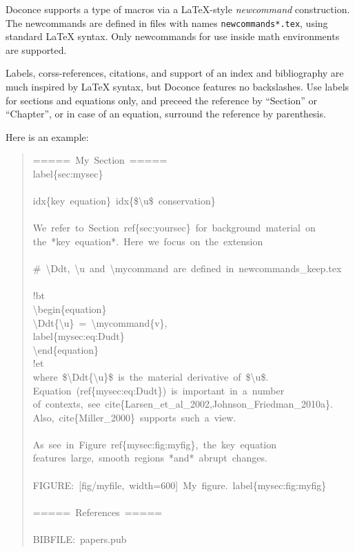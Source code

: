 \documentclass[a4paper]{article}
\begin{document}
Doconce supports a type of macros via a LaTeX-style \emph{newcommand}
construction.  The newcommands are defined in files with names
\texttt{newcommands*.tex}, using standard LaTeX syntax. Only newcommands
for use inside math environments are supported.

Labels, corss-references, citations, and support of an index and
bibliography are much inspired by LaTeX syntax, but Doconce features
no backslashes. Use labels for sections and equations only, and
preceed the reference by ``Section'' or ``Chapter'', or in case of
an equation, surround the reference by parenthesis.

Here is an example:
%
\begin{quote}{\ttfamily \raggedright \noindent
=====~My~Section~=====\\
label\{sec:mysec\}\\
~\\
idx\{key~equation\}~idx\{\$\textbackslash{}u\$~conservation\}\\
~\\
We~refer~to~Section~ref\{sec:yoursec\}~for~background~material~on\\
the~*key~equation*.~Here~we~focus~on~the~extension\\
~\\
\#~\textbackslash{}Ddt,~\textbackslash{}u~and~\textbackslash{}mycommand~are~defined~in~newcommands\_keep.tex\\
~\\
!bt\\
\textbackslash{}begin\{equation\}\\
\textbackslash{}Ddt\{\textbackslash{}u\}~=~\textbackslash{}mycommand\{v\},\\
label\{mysec:eq:Dudt\}\\
\textbackslash{}end\{equation\}\\
!et\\
where~\$\textbackslash{}Ddt\{\textbackslash{}u\}\$~is~the~material~derivative~of~\$\textbackslash{}u\$.\\
Equation~(ref\{mysec:eq:Dudt\})~is~important~in~a~number\\
of~contexts,~see~cite\{Larsen\_et\_al\_2002,Johnson\_Friedman\_2010a\}.\\
Also,~cite\{Miller\_2000\}~supports~such~a~view.\\
~\\
As~see~in~Figure~ref\{mysec:fig:myfig\},~the~key~equation\\
features~large,~smooth~regions~*and*~abrupt~changes.\\
~\\
FIGURE:~{[}fig/myfile,~width=600{]}~My~figure.~label\{mysec:fig:myfig\}\\
~\\
=====~References~=====\\
~\\
BIBFILE:~papers.pub
}
\end{quote}
\end{document}

